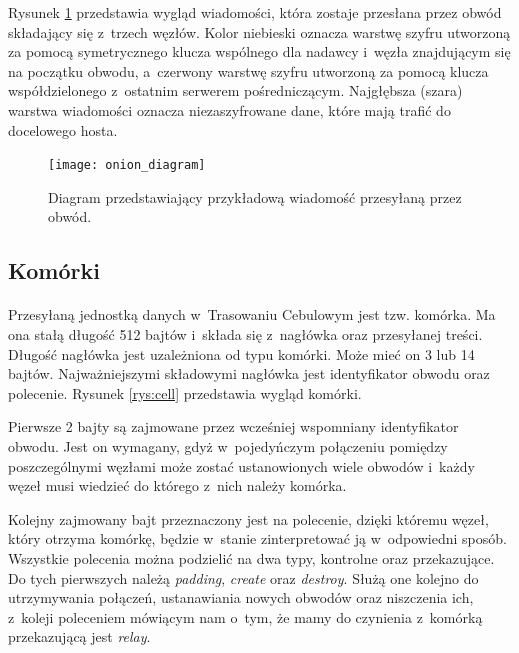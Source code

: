 Rysunek \ref{rys:onion_diagram} przedstawia wygląd wiadomości, która zostaje przesłana przez obwód składający się z~trzech węzłów. Kolor niebieski oznacza warstwę szyfru utworzoną za pomocą symetrycznego klucza wspólnego dla nadawcy i~węzła znajdującym się na początku obwodu, a~czerwony warstwę szyfru utworzoną za pomocą klucza współdzielonego z~ostatnim serwerem pośredniczącym. Najgłębsza (szara) warstwa wiadomości oznacza niezaszyfrowane dane, które mają trafić do docelowego hosta.

\begin{figure}
  \centering
  \texttt{[image: onion\_diagram]} 
  \caption[Caption for LOF]{Diagram przedstawiający przykładową wiadomość przesyłaną przez obwód\footnotemark.}
  \label{rys:onion_diagram}
\end{figure}

\subsection{Komórki}\paragraph{}
Przesyłaną jednostką danych w~Trasowaniu Cebulowym jest tzw. komórka. Ma ona stałą długość 512 bajtów i~składa się z~nagłówka oraz przesyłanej treści. Długość nagłówka jest uzależniona od typu komórki. Może mieć on 3 lub 14 bajtów. Najważniejszymi składowymi nagłówka jest identyfikator obwodu oraz polecenie. Rysunek \ref{rys:cell} przedstawia wygląd komórki.

Pierwsze 2 bajty są zajmowane przez wcześniej wspomniany identyfikator obwodu. Jest on wymagany, gdyż w~pojedyńczym połączeniu pomiędzy poszczególnymi węzłami może zostać ustanowionych wiele obwodów i~każdy węzeł musi wiedzieć do którego z~nich należy komórka.

Kolejny zajmowany bajt przeznaczony jest na polecenie, dzięki któremu węzeł, który otrzyma komórkę, będzie w~stanie zinterpretować ją w~odpowiedni sposób. Wszystkie polecenia można podzielić na dwa typy, kontrolne oraz przekazujące. Do tych pierwszych należą \textit{padding}, \textit{create} oraz \textit{destroy}. Służą one kolejno do utrzymywania połączeń, ustanawiania nowych obwodów oraz niszczenia ich, z~koleji poleceniem mówiącym nam o~tym, że mamy do czynienia z~komórką przekazującą jest \textit{relay}.

